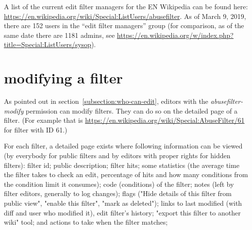 A list of the current edit filter managers for the EN Wikipedia can be found here: \url{https://en.wikipedia.org/wiki/Special:ListUsers/abusefilter}.
As of March 9, 2019, there are 152 users in the ``edit filter managers'' group (for comparison, as of the same date there are 1181 admins, see \url{https://en.wikipedia.org/w/index.php?title=Special:ListUsers/sysop}).

\section{modifying a filter}

As pointed out in section~\ref{subsection:who-can-edit}, editors with the \emph{abusefilter-modify} permission can modify filters.
They can do so on the detailed page of a filter.
(For example that is \url{https://en.wikipedia.org/wiki/Special:AbuseFilter/61} for filter with ID 61.)

For each filter, a detailed page exists where following information can be viewed (by everybody for public filters and by editors with proper rights for hidden filters):
filter id; public description; filter hits; some statistics (the average time the filter takes to check an edit, percentage of hits and how many conditions from the condition limit it consumes); code (conditions) of the filter; notes (left by filter editors, generally to log changes); flags ("Hide details of this filter from public view", "enable this filter", "mark as deleted");
links to last modified (with diff and user who modified it), edit filter's history; "export this filter to another wiki" tool;
and actions to take when the filter matches;


